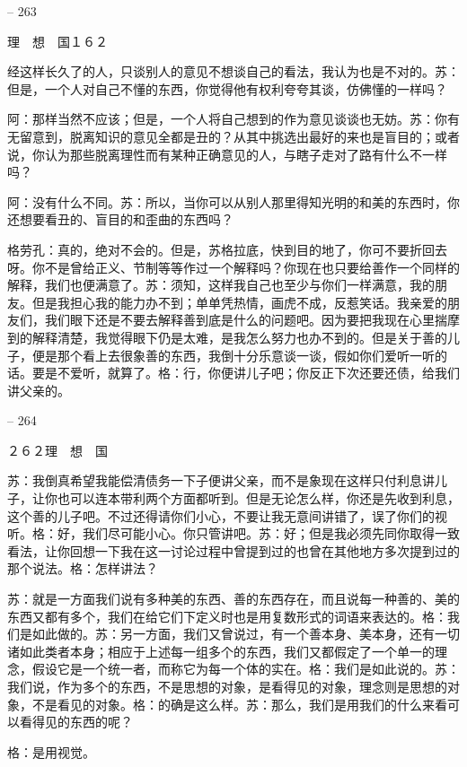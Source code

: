 \documentclass[11pt,oneside]{book}
\begin{document}
\begin{common-format}
    

-- 263

    理　想　国１６２

    经这样长久了的人，只谈别人的意见不想谈自己的看法，我认为也是不对的。苏：但是，一个人对自己不懂的东西，你觉得他有权利夸夸其谈，仿佛懂的一样吗？

    阿：那样当然不应该；但是，一个人将自己想到的作为意见谈谈也无妨。苏：你有无留意到，脱离知识的意见全都是丑的？从其中挑选出最好的来也是盲目的；或者说，你认为那些脱离理性而有某种正确意见的人，与瞎子走对了路有什么不一样吗？

    阿：没有什么不同。苏：所以，当你可以从别人那里得知光明的和美的东西时，你还想要看丑的、盲目的和歪曲的东西吗？

    格劳孔：真的，绝对不会的。但是，苏格拉底，快到目的地了，你可不要折回去呀。你不是曾给正义、节制等等作过一个解释吗？你现在也只要给善作一个同样的解释，我们也便满意了。苏：须知，这样我自己也至少与你们一样满意，我的朋友。但是我担心我的能力办不到；单单凭热情，画虎不成，反惹笑话。我亲爱的朋友们，我们眼下还是不要去解释善到底是什么的问题吧。因为要把我现在心里揣摩到的解释清楚，我觉得眼下仍是太难，是我怎么努力也办不到的。但是关于善的儿子，便是那个看上去很象善的东西，我倒十分乐意谈一谈，假如你们爱听一听的话。要是不爱听，就算了。格：行，你便讲儿子吧；你反正下次还要还债，给我们讲父亲的。

    

-- 264

    ２６２理　想　国

    苏：我倒真希望我能偿清债务一下子便讲父亲，而不是象现在这样只付利息讲儿子，让你也可以连本带利两个方面都听到。但是无论怎么样，你还是先收到利息，这个善的儿子吧。不过还得请你们小心，不要让我无意间讲错了，误了你们的视听。格：好，我们尽可能小心。你只管讲吧。苏：好；但是我必须先同你取得一致看法，让你回想一下我在这一讨论过程中曾提到过的也曾在其他地方多次提到过的那个说法。格：怎样讲法？

    苏：就是一方面我们说有多种美的东西、善的东西存在，而且说每一种善的、美的东西又都有多个，我们在给它们下定义时也是用复数形式的词语来表达的。格：我们是如此做的。苏：另一方面，我们又曾说过，有一个善本身、美本身，还有一切诸如此类者本身；相应于上述每一组多个的东西，我们又都假定了一个单一的理念，假设它是一个统一者，而称它为每一个体的实在。格：我们是如此说的。苏：我们说，作为多个的东西，不是思想的对象，是看得见的对象，理念则是思想的对象，不是看见的对象。格：的确是这么样。苏：那么，我们是用我们的什么来看可以看得见的东西的呢？

    格：是用视觉。

    


\end{common-format}
\end{document}

